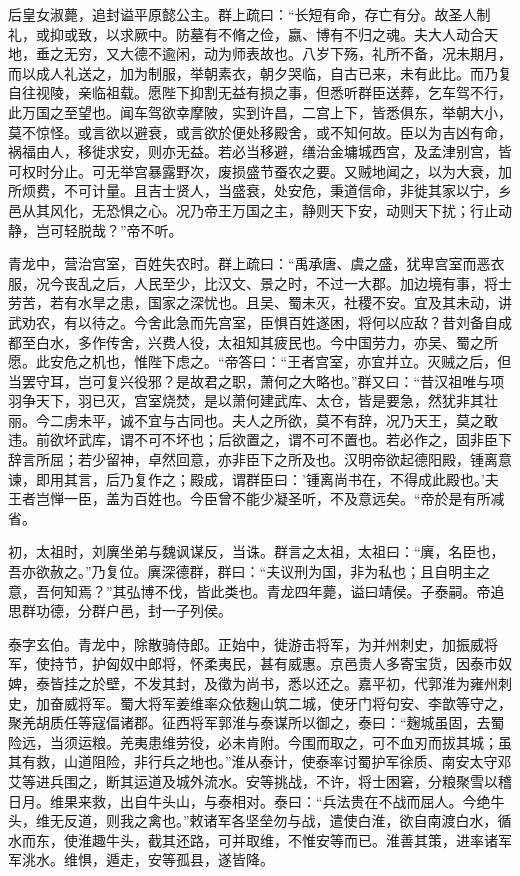 \documentclass[12pt,UTF8]{ctexbook}
\begin{document}
后皇女淑薨，追封谥平原懿公主。群上疏曰：“长短有命，存亡有分。故圣人制礼，或抑或致，以求厥中。防墓有不脩之俭，嬴、博有不归之魂。夫大人动合天地，垂之无穷，又大德不逾闲，动为师表故也。八岁下殇，礼所不备，况未期月，而以成人礼送之，加为制服，举朝素衣，朝夕哭临，自古已来，未有此比。而乃复自往视陵，亲临祖载。愿陛下抑割无益有损之事，但悉听群臣送葬，乞车驾不行，此万国之至望也。闻车驾欲幸摩陂，实到许昌，二宫上下，皆悉俱东，举朝大小，莫不惊怪。或言欲以避衰，或言欲於便处移殿舍，或不知何故。臣以为吉凶有命，祸福由人，移徙求安，则亦无益。若必当移避，缮治金墉城西宫，及孟津别宫，皆可权时分止。可无举宫暴露野次，废损盛节蚕农之要。又贼地闻之，以为大衰，加所烦费，不可计量。且吉士贤人，当盛衰，处安危，秉道信命，非徙其家以宁，乡邑从其风化，无恐惧之心。况乃帝王万国之主，静则天下安，动则天下扰；行止动静，岂可轻脱哉？”帝不听。

青龙中，营治宫室，百姓失农时。群上疏曰：“禹承唐、虞之盛，犹卑宫室而恶衣服，况今丧乱之后，人民至少，比汉文、景之时，不过一大郡。加边境有事，将士劳苦，若有水旱之患，国家之深忧也。且吴、蜀未灭，社稷不安。宜及其未动，讲武劝农，有以待之。今舍此急而先宫室，臣惧百姓遂困，将何以应敌？昔刘备自成都至白水，多作传舍，兴费人役，太祖知其疲民也。今中国劳力，亦吴、蜀之所愿。此安危之机也，惟陛下虑之。“帝答曰：“王者宫室，亦宜并立。灭贼之后，但当罢守耳，岂可复兴役邪？是故君之职，萧何之大略也。”群又曰：“昔汉祖唯与项羽争天下，羽已灭，宫室烧焚，是以萧何建武库、太仓，皆是要急，然犹非其壮丽。今二虏未平，诚不宜与古同也。夫人之所欲，莫不有辞，况乃天王，莫之敢违。前欲坏武库，谓不可不坏也；后欲置之，谓不可不置也。若必作之，固非臣下辞言所屈；若少留神，卓然回意，亦非臣下之所及也。汉明帝欲起德阳殿，锺离意谏，即用其言，后乃复作之；殿成，谓群臣曰：'锺离尚书在，不得成此殿也。'夫王者岂惮一臣，盖为百姓也。今臣曾不能少凝圣听，不及意远矣。“帝於是有所减省。

初，太祖时，刘廙坐弟与魏讽谋反，当诛。群言之太祖，太祖曰：“廙，名臣也，吾亦欲赦之。”乃复位。廙深德群，群曰：“夫议刑为国，非为私也；且自明主之意，吾何知焉？”其弘博不伐，皆此类也。青龙四年薨，谥曰靖侯。子泰嗣。帝追思群功德，分群户邑，封一子列侯。

泰字玄伯。青龙中，除散骑侍郎。正始中，徙游击将军，为并州刺史，加振威将军，使持节，护匈奴中郎将，怀柔夷民，甚有威惠。京邑贵人多寄宝货，因泰市奴婢，泰皆挂之於壁，不发其封，及徵为尚书，悉以还之。嘉平初，代郭淮为雍州刺史，加奋威将军。蜀大将军姜维率众依麹山筑二城，使牙门将句安、李歆等守之，聚羌胡质任等寇偪诸郡。征西将军郭淮与泰谋所以御之，泰曰：“麹城虽固，去蜀险远，当须运粮。羌夷患维劳役，必未肯附。今围而取之，可不血刃而拔其城；虽其有救，山道阻险，非行兵之地也。”淮从泰计，使泰率讨蜀护军徐质、南安太守邓艾等进兵围之，断其运道及城外流水。安等挑战，不许，将士困窘，分粮聚雪以稽日月。维果来救，出自牛头山，与泰相对。泰曰：“兵法贵在不战而屈人。今绝牛头，维无反道，则我之禽也。”敕诸军各坚垒勿与战，遣使白淮，欲自南渡白水，循水而东，使淮趣牛头，截其还路，可并取维，不惟安等而已。淮善其策，进率诸军军洮水。维惧，遁走，安等孤县，遂皆降。
\end{document}
